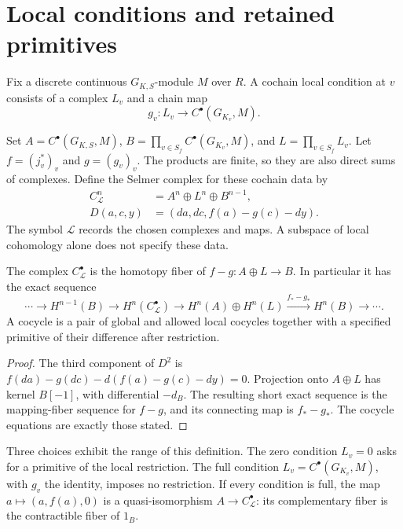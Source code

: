 \section{Local conditions and retained primitives}
\label{v4-arith:coefficients:sec:local}

Fix a discrete continuous \(G_{K,S}\)-module \(M\) over \(R\).
A cochain local condition at \(v\) consists of a complex \(L_v\)
and a chain map
\[
 g_v:L_v\longrightarrow C^\bullet(G_{K_v},M).
\]

Set \(A=C^\bullet(G_{K,S},M)\),
\(B=\prod_{v\in S_f}C^\bullet(G_{K_v},M)\), and
\(L=\prod_{v\in S_f}L_v\). Let \(f=(j_v^*)_v\) and
\(g=(g_v)_v\). The products are finite, so they are also direct sums
of complexes. Define the Selmer complex for these cochain data by
\begin{equation}\label{v4-arith:coefficients:eq:selmer-complex}
 \begin{split}
 C^n_{\mathcal L}&=A^n\oplus L^n\oplus B^{n-1},\\
 D(a,c,y)&=(da,dc,f(a)-g(c)-dy).
 \end{split}
\end{equation}
The symbol \(\mathcal L\) records the chosen complexes and maps.
A subspace of local cohomology alone does not specify these data.

\begin{proposition}\label{v4-arith:coefficients:prop:selmer-complex}
The complex \(C^\bullet_{\mathcal L}\) is the homotopy fiber of
\(f-g:A\oplus L\to B\). In particular it has the exact sequence
\[
 \cdots\longrightarrow H^{n-1}(B)
 \longrightarrow H^n(C^\bullet_{\mathcal L})
 \longrightarrow H^n(A)\oplus H^n(L)
 \xrightarrow{f_*-g_*}H^n(B)\longrightarrow\cdots.
\]
A cocycle is a pair of global and allowed local cocycles together
with a specified primitive of their difference after restriction.
\end{proposition}
\begin{proof}
The third component of \(D^2\) is
\(f(da)-g(dc)-d(f(a)-g(c)-dy)=0\).
Projection onto \(A\oplus L\) has kernel \(B[-1]\), with
differential \(-d_B\). The resulting short exact sequence is the
mapping-fiber sequence for \(f-g\), and its connecting map is
\(f_*-g_*\). The cocycle equations are exactly those stated.
\end{proof}

Three choices exhibit the range of this definition. The zero
condition \(L_v=0\) asks for a primitive of the local restriction.
The full condition \(L_v=C^\bullet(G_{K_v},M)\), with \(g_v\) the
identity, imposes no restriction. If every condition is full, the map
\(a\mapsto(a,f(a),0)\) is a quasi-isomorphism
\(A\to C^\bullet_{\mathcal L}\): its complementary fiber is the
contractible fiber of \(1_B\).


